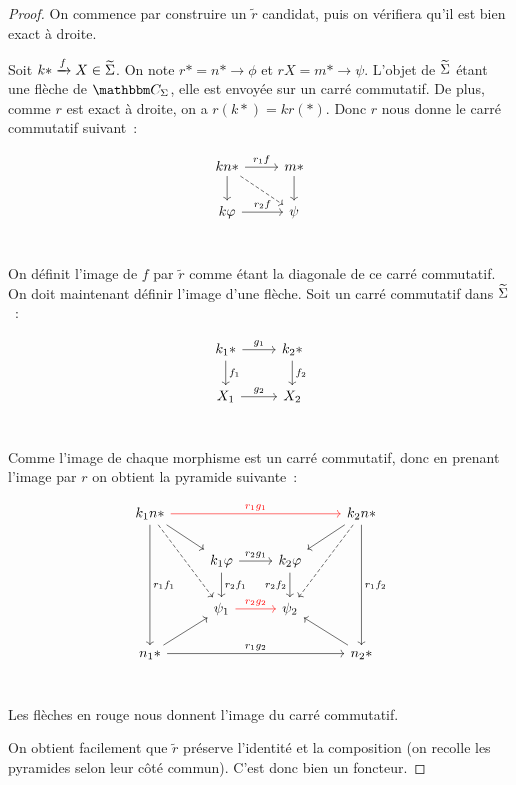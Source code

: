 \begin{proof}
    On commence par construire un $\tilde{r}$ candidat, puis on
    vérifiera qu'il est bien exact à droite.
    
    Soit $k\ast\xrightarrow{f} X\in\widetilde{\Sigma}$. On note $r\ast = n\ast\rightarrow\phi$
    et $rX = m\ast\rightarrow\psi$. L'objet de $\widetilde{\Sigma}$ étant une flèche de $\C_\Sigma$,
    elle est envoyée sur un carré commutatif. De plus, comme $r$ est exact à droite,
    on a $r(k\ast) = kr(\ast)$. Donc $r$ nous donne le carré commutatif suivant~:

    \[\begin{tikzcd}
        kn\ast\arrow[r, "r_1f"]\arrow[d]\arrow[dr,dashed] & m\ast\arrow[d] \\
        k\phi\arrow[r, "r_2f"] & \psi \\
    \end{tikzcd}\]

    On définit l'image de $f$ par $\tilde{r}$ comme étant la diagonale de ce carré
    commutatif. On doit maintenant définir l'image d'une flèche. Soit un carré commutatif
    dans $\widetilde{\Sigma}$~:

    \[\begin{tikzcd}
        k_1\ast\arrow[r,"g_1"]\arrow[d,"f_1"] & k_2\ast\arrow[d,"f_2"] \\
        X_1\arrow[r,"g_2"] & X_2 \\
    \end{tikzcd}\]

    Comme l'image de chaque morphisme est un carré commutatif, donc en prenant
    l'image par $r$ on obtient la pyramide suivante~:

    \[\begin{tikzcd}
        k_1n\ast\arrow[rrr,red,"r_1g_1"]\arrow[dr]\arrow[ddd, "r_1f_1"]\arrow[ddr,dashed]
            & & & k_2n\ast\arrow[dl]\arrow[ddd, "r_1f_2"]\arrow[ddl,dashed] \\
        & k_1\phi\arrow[r,"r_2g_1"]\arrow[d,"r_2f_1"]
            & k_2\phi\arrow[d,swap,"r_2f_2"] & \\
        & \psi_1\arrow[r,red,"r_2g_2"]
            & \psi_2 & \\
        n_1\ast\arrow[ur]\arrow[rrr,"r_1g_2"]
            & & & n_2\ast\arrow[ul] \\
    \end{tikzcd}\]

    Les flèches en rouge nous donnent l'image du carré commutatif.

    On obtient facilement que $\tilde{r}$ préserve l'identité et la composition
    (on recolle les pyramides selon leur côté commun). C'est donc bien un foncteur.


\end{proof}
